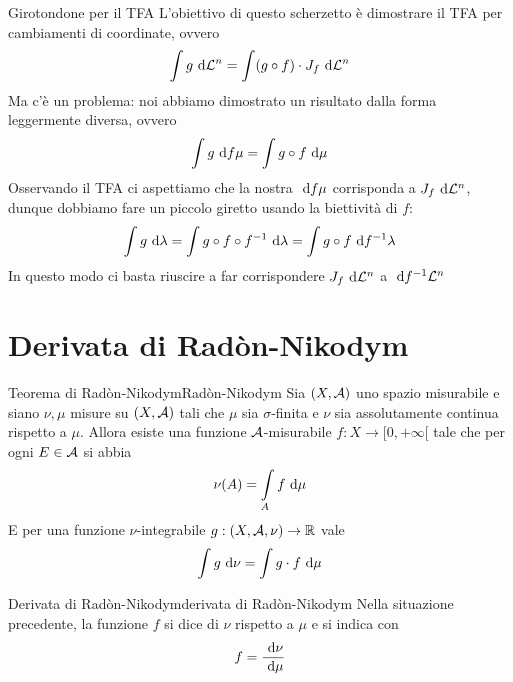 \documentclass{article}
\begin{document}
\begin{remark}{Girotondone per il TFA}{}
    L'obiettivo di questo scherzetto è dimostrare il TFA per cambiamenti di coordinate, ovvero
    \[\int\limits g \text{ d} \mathcal{L}^n = \int\limits (g \circ f)\cdot J_f \text{ d} \mathcal{L}^n  \]
    Ma c'è un problema: noi abbiamo dimostrato un risultato dalla forma leggermente diversa, ovvero 
    \[\int\limits g \text{ d} f\mu = \int\limits g\circ f \text{ d} \mu \]
    Osservando il TFA ci aspettiamo che la nostra $\text{ d} f\mu$ corrisponda a $J_f \text{ d} \mathcal{L}^n$, dunque dobbiamo fare un piccolo giretto usando la biettività di $f$:
    \[\int\limits g \text{ d} \lambda = \int\limits g \circ f \circ f^{-1} \text{ d} \lambda = \int\limits g \circ f \text{ d} f^{-1}\lambda\]
    In questo modo ci basta riuscire a far corrispondere $J_f \text{ d} \mathcal{L}^n$ a $\text{ d} f^{-1} \mathcal{L}^n$
\end{remark}

\section{Derivata di Radòn-Nikodym}

\begin{theorem}{Teorema di Radòn-Nikodym}{Radòn-Nikodym}
    Sia $(X,\mathcal{A})$ uno spazio misurabile e siano $\nu, \mu$ misure su $(X,\mathcal{A})$ tali che $\mu$ sia $\sigma$-finita e $\nu$ sia assolutamente continua rispetto a $\mu$. Allora esiste una funzione $\mathcal{A}$-misurabile $f: X \to [0,+\infty[$ tale che per ogni $E \in \mathcal{A}$ si abbia
    \[\nu(A) = \int\limits_A f \text{ d} \mu \]
    E per una funzione $\nu$-integrabile $g : (X,\mathcal{A},\nu)\to \mathbb{R}$ vale
    \[\int\limits g \text{ d} \nu = \int\limits g \cdot f \text{ d} \mu\]
\end{theorem}
\begin{definition}{Derivata di Radòn-Nikodym}{derivata di Radòn-Nikodym}
    Nella situazione precedente, la funzione $f$ si dice  di $\nu$ rispetto a $\mu$ e si indica con
    \[f = \frac{\text{ d} \nu}{\text{ d} \mu}\]
\end{definition}
\end{document}
